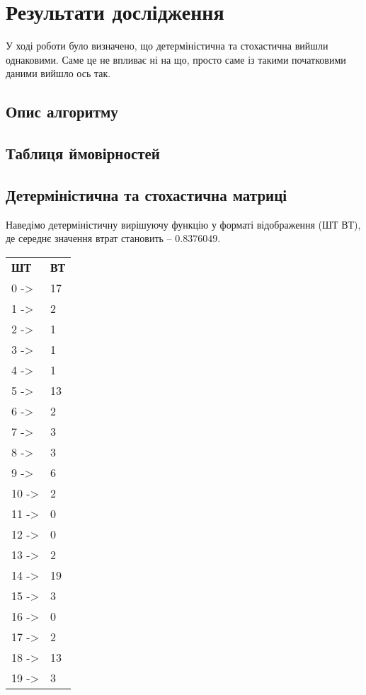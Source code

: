 \section{Результати дослідження}
У ході роботи було визначено, що детерміністична та стохастична вийшли однаковими.
Саме це не впливає ні на що, просто саме із такими початковими даними вийшло ось так.

\subsection{Опис алгоритму}



\subsection{Таблиця ймовірностей}



\subsection{Детерміністична та стохастична матриці}
Наведімо детерміністичну вирішуючу функцію у форматі відображення (ШТ \shortrightarrow ВТ), де середнє значення втрат становить -- $0.8376049$.

\begin{tabularx}{\textwidth}{|XX|}
	\textbf{ШТ} & \textbf{ВТ} \\
	0 -> & 17 \\
	1 -> & 2 \\
	2 -> & 1 \\
	3 -> & 1 \\
	4 -> & 1 \\
	5 -> & 13 \\
	6 -> & 2 \\
	7 -> & 3 \\
	8 -> & 3 \\
	9 -> & 6 \\
	10 -> & 2 \\
	11 -> & 0 \\
	12 -> & 0 \\
	13 -> & 2 \\
	14 -> & 19 \\
	15 -> & 3 \\
	16 -> & 0 \\
	17 -> & 2 \\
	18 -> & 13 \\
	19 -> & 3 \\
\end{tabularx}

